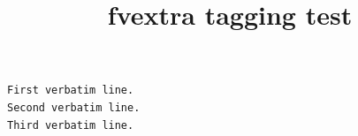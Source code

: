 \documentclass{article}
\title{fvextra tagging test}
\begin{document}
\begin{Verbatim}
First verbatim line.
Second verbatim line.
Third verbatim line.
\end{Verbatim}
\end{document}
